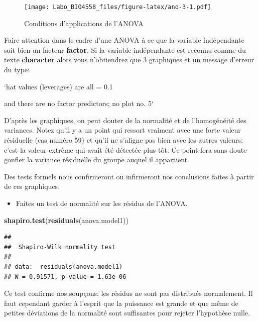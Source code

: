 \documentclass[
  12pt,
]{book}
\makeatletter
\newenvironment{Shaded}{\begin{snugshade}}{\end{snugshade}}
\newcommand{\KeywordTok}[1]{\textcolor[rgb]{0.13,0.29,0.53}{\textbf{#1}}}
\newcommand{\NormalTok}[1]{#1}
\providecommand{\tightlist}{%
  \setlength{\itemsep}{0pt}\setlength{\parskip}{0pt}}
\newenvironment{kframe}{%
\medskip{}
\setlength{\fboxsep}{.8em}
\def\at@end@of@kframe{}%
\ifinner\ifhmode%
 \def\at@end@of@kframe{\end{minipage}}%
 \begin{minipage}{\columnwidth}%
\fi\fi%
\def\FrameCommand##1{\hskip\@totalleftmargin \hskip-\fboxsep
\colorbox{incolor}{##1}\hskip-\fboxsep
    \hskip-\linewidth \hskip-\@totalleftmargin \hskip\columnwidth}%
\MakeFramed {\advance\hsize-\width
  \@totalleftmargin\z@ \linewidth\hsize
  \@setminipage}}%
{\par\unskip\endMakeFramed%
\at@end@of@kframe}
\newenvironment{rmdblock}[1]
 {
 \begin{itemize}
 \renewcommand{\labelitemi}{
   \raisebox{-.7\height}[0pt][0pt]{
     {\setkeys{Gin}{width=3em,keepaspectratio}\texttt{[image: images/\#1]}}
   }
 }
 \begin{kframe}
 \setlength{\fboxsep}{1em}
 \item
 }
 {
 \end{kframe}
 \end{itemize}
 }
\newenvironment{rmdwarning}
  {\begin{rmdblock}{warning}}
  {\end{rmdblock}}
\makeatother
\begin{document}
\begin{figure}
\centering
\texttt{[image: Labo\_BIO4558\_files/figure-latex/ano-3-1.pdf]}
\caption{\label{fig:ano-3}Conditions d'applications de l'ANOVA}
\end{figure}

\begin{rmdwarning}
Faire attention dans le cadre d'une ANOVA à ce que la variable indépendante soit bien un facteur \textbf{factor}. Si la variable indépendante est reconnu comme du texte \textbf{character} alors vous n'obtiendrez que 3 graphiques et un message d'erreur du type:

`hat values (leverages) are all = 0.1

and there are no factor predictors; no plot no. 5`
\end{rmdwarning}

D'après les graphiques, on peut douter de la normalité et de l'homogénéité des variances. Notez qu'il y a un point qui ressort vraiment avec une forte valeur résiduelle (cas numéro 59) et qu'il ne s'aligne pas bien avec les autres valeurs: c'est la valeur extrême qui avait été détectée plus tôt. Ce point fera sans doute gonfler la variance résiduelle du groupe auquel il appartient.

Des tests formels nous confirmeront ou infirmeront nos conclusions faites à partir de ces graphiques.

\begin{itemize}
\tightlist
\item
  Faites un test de normalité sur les résidus de l'ANOVA.
\end{itemize}

\begin{Shaded}
\begin{Highlighting}[]
\KeywordTok{shapiro.test}\NormalTok{(}\KeywordTok{residuals}\NormalTok{(anova.model1))}
\end{Highlighting}
\end{Shaded}

\begin{verbatim}
## 
##  Shapiro-Wilk normality test
## 
## data:  residuals(anova.model1)
## W = 0.91571, p-value = 1.63e-06
\end{verbatim}

Ce test confirme nos soupçons: les résidus ne sont pas distribués normalement. Il faut cependant garder à l'esprit que la puissance est grande et que même de petites déviations de la normalité sont suffisantes pour rejeter l'hypothèse nulle.
\end{document}
